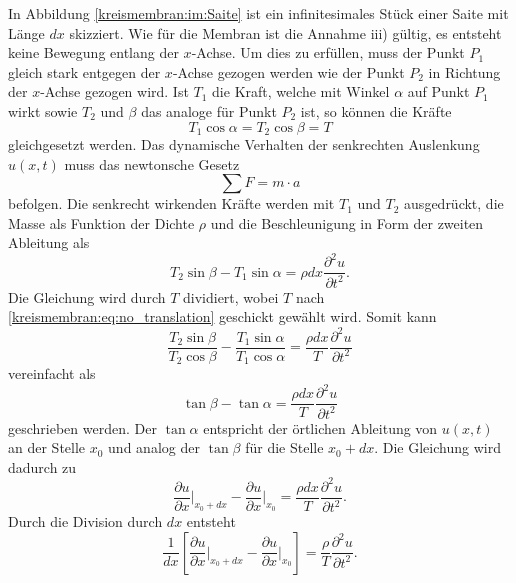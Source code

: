 In Abbildung \ref{kreismembran:im:Saite} ist ein infinitesimales Stück einer Saite mit Länge $ dx $ skizziert.
Wie für die Membran ist die Annahme iii) gültig, es entsteht keine Bewegung entlang der $ x $-Achse.
Um dies zu erfüllen, muss der Punkt $ P_1 $ gleich stark entgegen der $ x $-Achse gezogen werden wie der Punkt $ P_2 $ in Richtung der $ x $-Achse gezogen wird. 
Ist $ T_1 $ die Kraft, welche mit Winkel $ \alpha $ auf Punkt $ P_1 $ wirkt sowie $ T_2 $ und $ \beta$ das analoge für Punkt $ P_2 $ ist, so können die Kräfte 
\begin{equation}\label{kreismembran:eq:no_translation}
	T_1 \cos \alpha = T_2 \cos \beta = T
\end{equation}
gleichgesetzt werden. 
Das dynamische Verhalten der senkrechten Auslenkung $ u(x,t) $ muss das newtonsche Gesetz 
%
\begin{equation*}
	\sum F = m \cdot a
\end{equation*} 
befolgen. Die senkrecht wirkenden Kräfte werden mit $ T_1 $ und $ T_2 $ ausgedrückt, die Masse als Funktion der Dichte $ \rho $ und die Beschleunigung in Form der zweiten Ableitung als
\begin{equation*}
	T_2 \sin \beta - T_1 \sin \alpha = \rho dx \frac{\partial^2 u}{\partial t^2} .
\end{equation*}
Die Gleichung wird durch $ T $ dividiert, wobei $ T $ nach \eqref{kreismembran:eq:no_translation} geschickt gewählt wird. Somit kann
\begin{equation*}
	\frac{T_2 \sin \beta}{T_2 \cos \beta} - \frac{T_1 \sin \alpha}{T_1 \cos \alpha} = \frac{\rho dx}{T} \frac{\partial^2 u}{\partial t^2}
\end{equation*}
vereinfacht als  
\begin{equation*}
	\tan \beta - \tan \alpha = \frac{\rho dx}{T} \frac{\partial^2 u}{\partial t^2}
\end{equation*}
geschrieben werden. 
Der $ \tan \alpha $ entspricht der örtlichen Ableitung von $ u(x,t) $ an der Stelle $ x_0 $ und analog der $ \tan \beta $ für die Stelle $ x_0 + dx $.
Die Gleichung wird dadurch zu
\begin{equation*}
	\frac{\partial u}{\partial x} \bigg|_{x_0 + dx} - \frac{\partial u}{\partial x} \bigg|_{x_0} = \frac{\rho dx}{T} \frac{\partial^2 u}{\partial t^2}.
\end{equation*} 
Durch die Division durch $ dx $ entsteht 
\begin{equation*}
	\frac{1}{dx} \left[\frac{\partial u}{\partial x} \bigg|_{x_0 + dx} - \frac{\partial u}{\partial x} \bigg|_{x_0}\right] = \frac{\rho}{T}\frac{\partial^2 u}{\partial t^2}.
\end{equation*}
